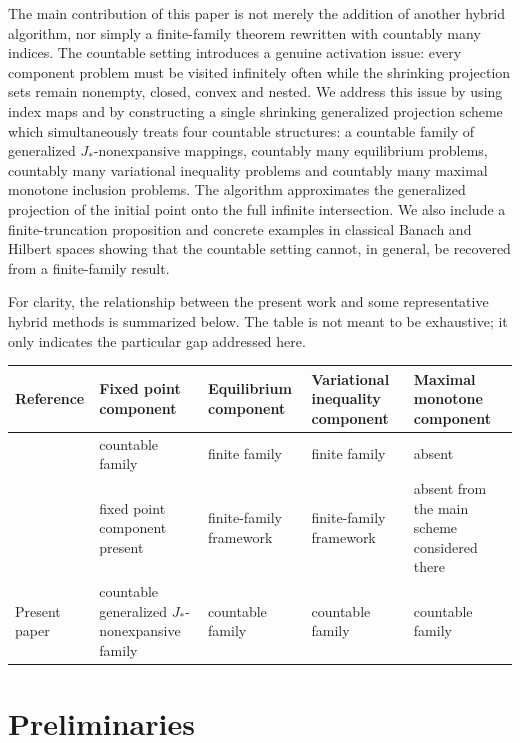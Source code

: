 \documentclass[leqno,12pt]{amsart}
\theoremstyle{definition}
\numberwithin{equation}{section}
\begin{document}
The main contribution of this paper is not merely the addition of another hybrid algorithm, nor simply a finite-family theorem rewritten with countably many indices. The countable setting introduces a genuine activation issue: every component problem must be visited infinitely often while the shrinking projection sets remain nonempty, closed, convex and nested. We address this issue by using index maps and by constructing a single shrinking generalized projection scheme which simultaneously treats four countable structures: a countable family of generalized $J_{*}$-nonexpansive mappings, countably many equilibrium problems, countably many variational inequality problems and countably many maximal monotone inclusion problems. The algorithm approximates the generalized projection of the initial point onto the full infinite intersection. We also include a finite-truncation proposition and concrete examples in classical Banach and Hilbert spaces showing that the countable setting cannot, in general, be recovered from a finite-family result.

For clarity, the relationship between the present work and some representative hybrid methods is summarized below. The table is not meant to be exhaustive; it only indicates the particular gap addressed here.
\begin{center}
\footnotesize
\setlength{\tabcolsep}{3pt}
\begin{tabular}{|>{\raggedright\arraybackslash}p{3.1cm}|>{\raggedright\arraybackslash}p{2.8cm}|>{\raggedright\arraybackslash}p{2.3cm}|>{\raggedright\arraybackslash}p{2.3cm}|>{\raggedright\arraybackslash}p{3.0cm}|}
\hline
Reference & Fixed point component & Equilibrium component & Variational inequality component & Maximal monotone component \\ \hline
\cite{UbaCarpathian2023} & countable family & finite family & finite family & absent \\ \hline
\cite{ZegeyeShahzad2011,ZegeyeShahzad2014} & fixed point component present & finite-family framework & finite-family framework & absent from the main scheme considered there \\ \hline
Present paper & countable generalized $J_{*}$-nonexpansive family & countable family & countable family & countable family \\ \hline
\end{tabular}
\end{center}

\section{Preliminaries}
\end{document}

